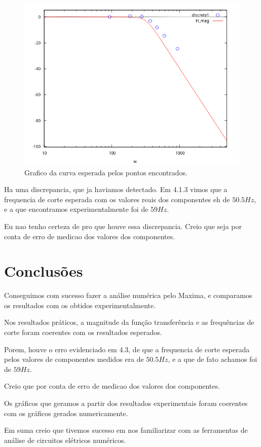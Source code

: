 \documentclass[12pt,twoside, a4paper, twocolumn]{article}
\begin{document}
\begin{figure}[h]
    \centering
    \includegraphics[width=1\columnwidth]{images/magnitudepontosreais.png}
    \caption{Grafico da curva esperada pelos pontos encontrados.}
\end{figure}

Ha uma discrepancia, que ja haviamos detectado. Em 4.1.3 vimos que a frequencia de corte esperada com os valores reais dos componentes eh de $50.5Hz$, e a que encontramos experimentalmente foi de $59Hz$.

Eu nao tenho certeza de pro que houve essa discrepancia. Creio que seja por conta de erro de medicao dos valores dos componentes.

\newpage


\section{Conclusões}

Conseguimos com sucesso fazer a análise numérica pelo Maxima, e comparamos os resultados com os obtidos experimentalmente.

Nos resultados práticos, a magnitude da função transferência e as frequências de corte foram coerentes com os resultados esperados.

Porem, houve o erro evidenciado em 4.3, de que a frequencia de corte esperada pelos valores de componentes medidos era de $50.5Hz$, e a que de fato achamos foi de $59Hz$.

Creio que por conta de erro de medicao dos valores dos componentes.

Os gráficos que geramos a partir dos resultados experimentais foram coerentes com os gráficos gerados numericamente.

Em suma creio que tivemos sucesso em nos familiarizar com as ferramentas de análise de circuitos elétricos numéricos.
\end{document}
